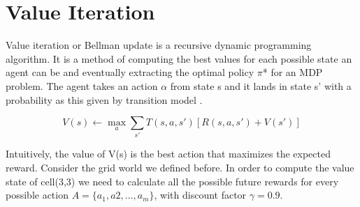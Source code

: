 \documentclass[10pt,a4paper,twocolumn]{article}
\begin{document}
	\section{Value Iteration}
	Value iteration or Bellman update is a recursive dynamic programming algorithm. It is a method of computing the best values for each possible state an agent can be and eventually extracting the optimal policy $\pi$* for an MDP problem. The agent takes an action $\alpha$ from state s and it lands in state s’ with a probability as this given by transition model . 
	
	\begin{equation}
		V(s) \leftarrow \max_{a}{ \sum_{s'}T(s,a,s') [R(s,a,s') + V(s')]}
	\end{equation}
	
	Intuitively, the value of V(s) is the best action that maximizes the expected reward. Consider the grid world we defined before. In order to compute the value state of cell(3,3) we need to calculate all the possible future rewards for every possible action $A = \{ a_{1}, a{2}, ..., a_{m} \}$, with discount factor $\gamma = 0.9$.
	
\end{document}
